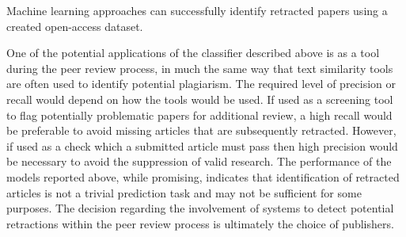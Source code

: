 \documentclass[pdflatex,sn-mathphys-num]{sn-jnl}%
\begin{document}



Machine learning approaches can successfully identify retracted papers using a created open-access dataset. 


One of the potential applications of the classifier described above is as a tool during the peer review process, in much the same way that text similarity tools are often used to identify potential plagiarism. The required level of precision or recall would depend on how the tools would be used. If used as a screening tool to flag potentially problematic papers for additional review, a high recall would be preferable to avoid missing articles that are subsequently retracted. However, if used as a check which a submitted article must pass then high precision would be necessary to avoid the suppression of valid research. The performance of the models reported above, while promising, indicates that identification of retracted articles is not a trivial prediction task and may not be sufficient for some purposes. The decision regarding the involvement of systems to detect potential retractions within the peer review process is ultimately the choice of publishers. 
\end{document}
